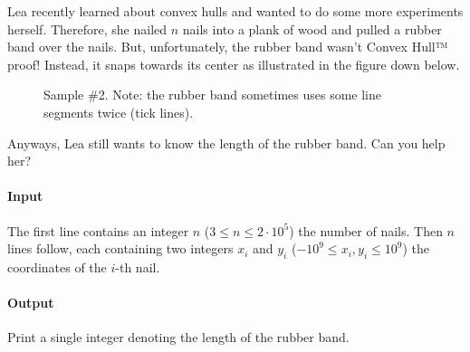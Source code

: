 
\usepackage{tkz-euclide}



\makeheader

Lea recently learned about convex hulls and wanted to
do some more experiments herself.
Therefore, she nailed $n$ nails into a plank of wood and
pulled a rubber band over the nails.
But, unfortunately, the rubber band wasn't Convex Hull™ proof!
Instead, it snaps towards its center as illustrated in the figure down below.
\begin{figure}[ht]
  \centering
  \caption{Sample \#2. Note: the rubber band sometimes uses some line segments twice (tick lines).}
  \label{fig:convexhull}
\end{figure}
Anyways, Lea still wants to know the length of the rubber band.
Can you help her?

\paragraph*{Input}

The first line contains an integer $n$ ($3 \leq n \leq 2\cdot10^5$) the number of nails.
Then $n$ lines follow, each containing two integers $x_i$ and $y_i$ ($-10^9 \leq x_i, y_i \leq 10^9$)
the coordinates of the $i$-th nail.

\paragraph*{Output}

Print a single integer denoting the length of the rubber band.

\begin{samples}
\end{samples}

